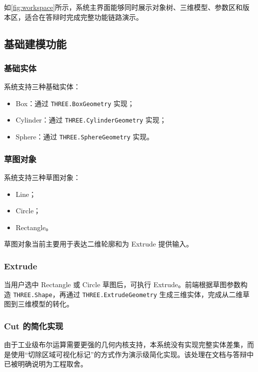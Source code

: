 \documentclass[supercite,macfont]{HustGSClassPaper}
\begin{document}
如\autoref{fig:workspace}所示，系统主界面能够同时展示对象树、三维模型、参数区和版本区，适合在答辩时完成完整功能链路演示。

\subsection{基础建模功能}

\subsubsection{基础实体}

系统支持三种基础实体：

\begin{itemize}[leftmargin=2em]
  \item Box：通过 \texttt{THREE.BoxGeometry} 实现；
  \item Cylinder：通过 \texttt{THREE.CylinderGeometry} 实现；
  \item Sphere：通过 \texttt{THREE.SphereGeometry} 实现。
\end{itemize}

\subsubsection{草图对象}

系统支持三种草图对象：

\begin{itemize}[leftmargin=2em]
  \item Line；
  \item Circle；
  \item Rectangle。
\end{itemize}

草图对象当前主要用于表达二维轮廓和为 Extrude 提供输入。

\subsubsection{Extrude}

当用户选中 Rectangle 或 Circle 草图后，可执行 Extrude。前端根据草图参数构造 \texttt{THREE.Shape}，再通过 \texttt{THREE.ExtrudeGeometry} 生成三维实体，完成从二维草图到三维模型的转化。

\subsubsection{Cut 的简化实现}

由于工业级布尔运算需要更强的几何内核支持，本系统没有实现完整实体差集，而是使用“切除区域可视化标记”的方式作为演示级简化实现。该处理在文档与答辩中已被明确说明为工程取舍。
\end{document}
